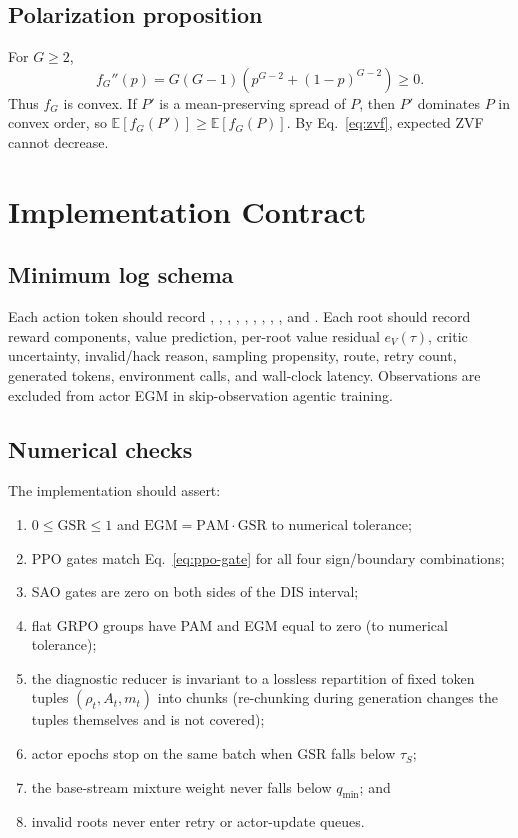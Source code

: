 \documentclass{article}
\newcommand{\egm}{\mathrm{EGM}}
\newcommand{\pam}{\mathrm{PAM}}
\newcommand{\gsr}{\mathrm{GSR}}
\newcommand{\E}{\mathbb{E}}
\begin{document}
\subsection{Polarization proposition}

For $G\geq2$,
\begin{equation*}
  f_G''(p)=G(G-1)\left(p^{G-2}+(1-p)^{G-2}\right)\geq0.
\end{equation*}
Thus $f_G$ is convex.  If $P'$ is a mean-preserving spread of $P$, then $P'$ 
dominates $P$ in convex order, so $\E[f_G(P')]\geq\E[f_G(P)]$.  By
Eq.~\eqref{eq:zvf}, expected ZVF cannot decrease.

\section{Implementation Contract}
\label{app:implementation}

\subsection{Minimum log schema}

\begin{sloppypar}
Each action token should record
, , ,
, ,
, , ,
, and .  Each root should record
reward components, value prediction, per-root value residual $e_V(\tau)$,
critic uncertainty, invalid/hack reason,
sampling propensity, route, retry count, generated tokens, environment calls,
and wall-clock latency.  Observations are excluded from actor EGM in
skip-observation agentic training.
\end{sloppypar}

\subsection{Numerical checks}

The implementation should assert:
\begin{enumerate}[leftmargin=*]
  \item $0\leq\gsr\leq1$ and $\egm=\pam\cdot\gsr$ to numerical tolerance;
  \item PPO gates match Eq.~\eqref{eq:ppo-gate} for all four sign/boundary
  combinations;
  \item SAO gates are zero on both sides of the DIS interval;
  \item flat GRPO groups have PAM and EGM equal to zero (to numerical tolerance);
  \item the diagnostic reducer is invariant to a lossless repartition of fixed
  token tuples $(\rho_t,A_t,m_t)$ into chunks (re-chunking during generation
  changes the tuples themselves and is not covered);
  \item actor epochs stop on the same batch when GSR falls below $\tau_S$;
  \item the base-stream mixture weight never falls below $q_{\min}$; and
  \item invalid roots never enter retry or actor-update queues.
\end{enumerate}
\end{document}
